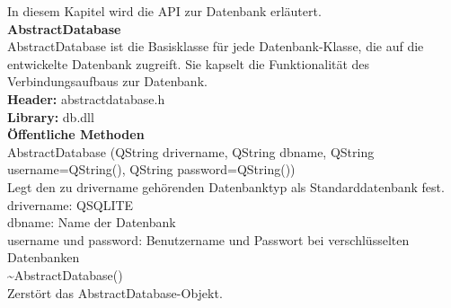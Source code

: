 In diesem Kapitel wird die API zur Datenbank erläutert.\bigskip \\
\textbf{AbstractDatabase}\\
AbstractDatabase ist die Basisklasse für jede Datenbank-Klasse, die auf die entwickelte Datenbank zugreift. Sie kapselt die Funktionalität des Verbindungsaufbaus zur Datenbank.\bigskip \\
\textbf{Header:} abstractdatabase.h\bigskip \\
\textbf{Library:} db.dll\bigskip \\
\textbf{Öffentliche Methoden}\\
\small{AbstractDatabase (QString drivername, QString dbname, QString username=QString(), QString password=QString())}\\
Legt den zu drivername gehörenden Datenbanktyp als Standarddatenbank fest.\\
drivername: QSQLITE\\
dbname: Name der Datenbank\\
username und password: Benutzername und Passwort bei verschlüsselten Datenbanken\bigskip \\
\small{\~{}AbstractDatabase()}\\
Zerstört das AbstractDatabase-Objekt.\bigskip \\

